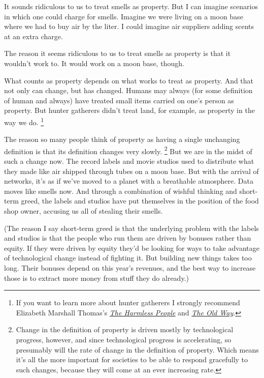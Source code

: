 \documentclass[12pt]{book}
\begin{document}
It sounds ridiculous to us to treat smells as property. But I can
imagine scenarios in which one could charge for smells. Imagine we were
living on a moon base where we had to buy air by the liter. I could
imagine air suppliers adding scents at an extra charge.

The reason it seems ridiculous to us to treat smells as property is that
it wouldn't work to. It would work on a moon base, though.

What counts as property depends on what works to treat as property. And
that not only can change, but has changed. Humans may always (for some
definition of human and always) have treated small items carried on
one's person as property. But hunter gatherers didn't treat land, for
example, as property in the way we do. \footnote{If you want to learn more about hunter gatherers I strongly
recommend Elizabeth Marshall Thomas's
\href{http://www.amazon.com/Harmless-People-Elizabeth-Marshall-Thomas/dp/0394427793}{\emph{The
Harmless People}} and
\href{http://www.amazon.com/Old-Way-Story-First-People/dp/0374225524}{\emph{The
Old Way}}.}

The reason so many people think of property as having a single
unchanging definition is that its definition changes very slowly.
\footnote{Change in the definition of property is driven mostly by
technological progress, however, and since technological progress is
accelerating, so presumably will the rate of change in the definition of
property. Which means it's all the more important for societies to be
able to respond gracefully to such changes, because they will come at an
ever increasing rate.} But we are in the midst of such a change now.
The record labels and movie studios used to distribute what they made
like air shipped through tubes on a moon base. But with the arrival of
networks, it's as if we've moved to a planet with a breathable
atmosphere. Data moves like smells now. And through a combination of
wishful thinking and short-term greed, the labels and studios have put
themselves in the position of the food shop owner, accusing us all of
stealing their smells.

(The reason I say short-term greed is that the underlying problem with
the labels and studios is that the people who run them are driven by
bonuses rather than equity. If they were driven by equity they'd be
looking for ways to take advantage of technological change instead of
fighting it. But building new things takes too long. Their bonuses
depend on this year's revenues, and the best way to increase those is to
extract more money from stuff they do already.)
\end{document}
